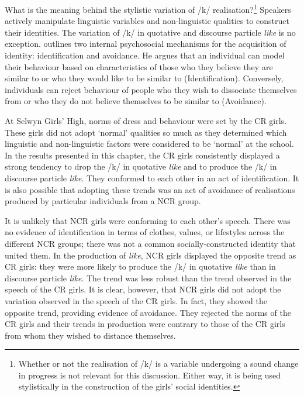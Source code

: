 What is the meaning behind the stylistic variation of /k/ realisation?\footnote{Whether or not the realisation of /k/ is a variable undergoing a sound change in progress is not relevant for this discussion. Either way, it is being used stylistically in the construction of the girls' social identities.} Speakers actively manipulate linguistic variables and non-linguistic qualities to construct their identities. The variation of /k/ in quotative and discourse particle \textit{like} is no exception. \citet{zwicky1997} outlines two internal psychosocial mechanisms for the acquisition of identity: identification and avoidance. He argues that an individual can model their behaviour based on characteristics of those who they believe they are similar to or who they would like to be similar to (Identification). Conversely, individuals can reject behaviour of people who they wish to dissociate themselves from or who they do not believe themselves to be similar to (Avoidance).

At Selwyn Girls' High, norms of dress and behaviour were set by the CR girls. These girls did not adopt `normal' qualities so much as they determined which linguistic and non-linguistic factors were considered to be `normal' at the school. In the results presented in this chapter, the CR girls consistently displayed a strong tendency to drop the /k/ in quotative \textit{like} and to produce the /k/ in discourse particle \textit{like}. They conformed to each other in an act of identification. It is also possible that adopting these trends was an act of avoidance of realisations produced by particular individuals from a NCR group.

It is unlikely that NCR girls were conforming to each other's speech. There was no evidence of identification in terms of clothes, values, or life\-styles across the different NCR groups; there was not a common so\-cially-con\-structed identity that united them. In the production of \textit{like}, NCR girls displayed the opposite trend as CR girls: they were more likely to produce the /k/ in quotative \textit{like} than in discourse particle \textit{like}. The trend was less robust than the trend observed in the speech of the CR girls. It is clear, however, that NCR girls did not adopt the variation observed in the speech of the CR girls. In fact, they showed the opposite trend, providing evidence of avoidance. They rejected the norms of the CR girls and their trends in production were contrary to those of the CR girls from whom they wished to distance themselves. 

